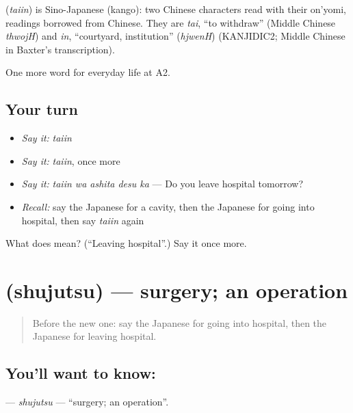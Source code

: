 \begin{cousinweb}
\textbf{} (\emph{taiin}) is Sino-Japanese (kango): two Chinese characters read with their on'yomi, readings borrowed from Chinese. They are \emph{tai}, \textquotedblleft{}to withdraw\textquotedblright{} (Middle Chinese \emph{thwojH}) and \emph{in}, \textquotedblleft{}courtyard, institution\textquotedblright{} (\emph{hjwenH}) (KANJIDIC2; Middle Chinese in Baxter's transcription).
\end{cousinweb}

\begin{grammarlens}[title={What you've built}]
One more word for everyday life at A2.
\end{grammarlens}

\subsection*{Your turn}
\begin{itemize}
\raggedright
  \item \emph{Say it:} \emph{taiin}
  \item \emph{Say it:} \emph{taiin}, once more
  \item \emph{Say it:} \emph{taiin wa ashita desu ka} — Do you leave hospital tomorrow?
  \item \emph{Recall:} say the Japanese for a cavity, then the Japanese for going into hospital, then say \emph{taiin} again
\end{itemize}

\begin{tcolorbox}[breakable,colback=teal!4,colframe=teal!35!black,title={Before you move on}]
What does  mean? (\textquotedblleft{}Leaving hospital\textquotedblright{}.) Say it once more.
\end{tcolorbox}
\section[\texorpdfstring{\ja{しゅじゅつ} (shujutsu)}{しゅじゅつ (shujutsu)}]{ (shujutsu) — surgery; an operation}

\label{lesson:JA-C218-shujutsu}



\begin{quote}
Before the new one: say the Japanese for going into hospital, then the Japanese for leaving hospital.
\end{quote}

\subsection*{You'll want to know: }
\textbf{} — \emph{shujutsu} — \textquotedblleft{}surgery; an operation\textquotedblright{}.

